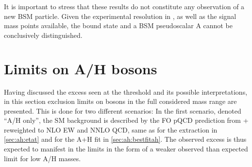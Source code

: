 It is important to stress that these results do not constitute any observation of a new BSM particle. Given the experimental resolution in \mtt, as well as the signal mass points available, the \ttbar bound state \etat and a BSM pseudoscalar A cannot be conclusively distinguished. 


% 


\section{Limits on A/H bosons}
\label{sec:ah:limits}

Having discussed the excess seen at the \ttbar threshold and its possible interpretations, in this section exclusion limits on \AH bosons in the full considered mass range are presented. This is done for two different scenarios: In the first scenario, denoted ``A/H only'', the SM \ttbar background is described by the FO pQCD prediction from \powheg + \pythia reweighted to NLO EW and NNLO QCD, same as for the \etat extraction in \cref{sec:ah:etat} and for the A+H fit in \cref{sec:ah:bestfitah}. The observed excess is thus expected to manifest in the limits in the form of a weaker observed than expected limit for low A/H masses.

